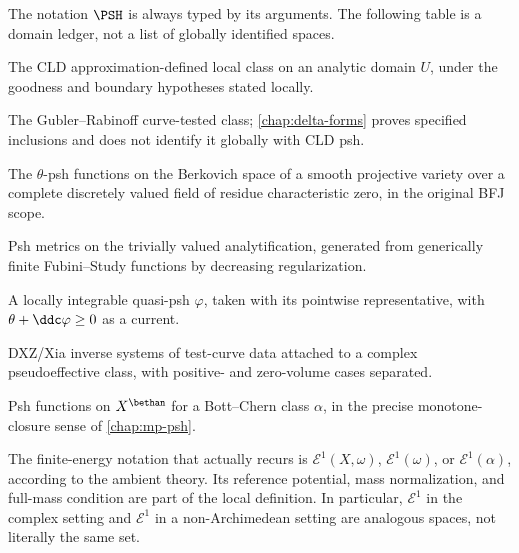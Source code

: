 
The notation \(\PSH\) is always typed by its arguments.  The following
table is a domain ledger, not a list of globally identified spaces.

\begin{description}[style=nextline,leftmargin=1.5em,labelindent=0pt]
\item[CLD local: \(\PSH(U)\).]
The CLD approximation-defined local class on an analytic domain \(U\), under
the goodness and boundary hypotheses stated locally.
\item[Curve-test local: ``classically psh''.]
The Gubler--Rabinoff curve-tested class; \cref{chap:delta-forms} proves specified
inclusions and does not identify it globally with CLD psh.
\item[BFJ global: \(\PSH(X,\theta)\).]
The \(\theta\)-psh functions on the Berkovich space of a smooth projective
variety over a complete discretely valued field of residue characteristic
zero, in the original BFJ scope.
\item[BJ homogeneous: \(\PSH_X(\theta)\), later \(\PSH(\omega)\).]
Psh metrics on the trivially valued analytification, generated from
generically finite Fubini--Study functions by decreasing regularization.
\item[Complex: \(\PSH(X,\theta)\).]
A locally integrable quasi-psh \(\varphi\), taken with its pointwise
representative, with \(\theta+\ddc\varphi\geq0\) as a current.
\item[Transcendental NA: \(\PSH^{\NA}(X,\theta)\).]
DXZ/Xia inverse systems of test-curve data attached to a complex
pseudoeffective class, with positive- and zero-volume cases separated.
\item[MP spectrum: \(\PSH(\alpha)\).]
Psh functions on \(X^{\bethan}\) for a Bott--Chern class \(\alpha\), in the
precise monotone-closure sense of \cref{chap:mp-psh}.
\end{description}

The finite-energy notation that actually recurs is
\(\mathcal E^1(X,\omega)\), \(\mathcal E^1(\omega)\), or
\(\mathcal E^1(\alpha)\), according to the ambient theory.
Its reference potential, mass normalization, and full-mass condition are
part of the local definition.  In particular, \(\mathcal E^1\) in the
complex setting and \(\mathcal E^1\) in a non-Archimedean setting are
analogous spaces, not literally the same set.

